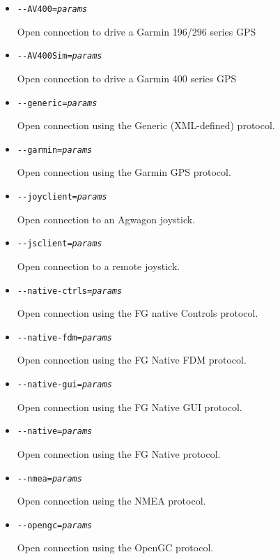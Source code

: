 \begin{itemize}
{\begin{itemize}
  \item{\texttt{-$ $-AV400={\it params}}}

    Open connection to drive a Garmin 196/296 series GPS

  \item{\texttt{-$ $-AV400Sim={\it params}}}

    Open connection to drive a Garmin 400 series GPS

  \item{\texttt{-$ $-generic={\it params}}}

    Open connection using the Generic (XML-defined) protocol.

  \item{\texttt{-$ $-garmin={\it params}}}

    Open connection using the Garmin GPS protocol.

  \item{\texttt{-$ $-joyclient={\it params}}}

    Open connection to an Agwagon joystick.

  \item{\texttt{-$ $-jsclient={\it params}}}

    Open connection to a remote joystick.

  \item{\texttt{-$ $-native-ctrls={\it params}}}

    Open connection using the FG native Controls protocol.

  \item{\texttt{-$ $-native-fdm={\it params}}}

    Open connection using the FG Native FDM protocol.

  \item{\texttt{-$ $-native-gui={\it params}}}

    Open connection using the FG Native GUI protocol.

  \item{\texttt{-$ $-native={\it params}}}

    Open connection using the FG Native protocol.

  \item{\texttt{-$ $-nmea={\it params}}}

    Open connection using the NMEA protocol.

  \item{\texttt{-$ $-opengc={\it params}}}

    Open connection using the OpenGC protocol.


\end{itemize}}
\end{itemize}
